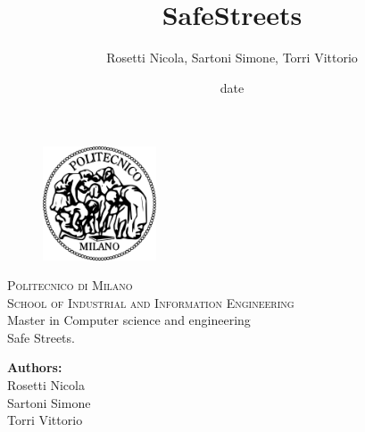 \documentclass[a4paper]{report}
\begin{document}
\title{SafeStreets}
\author{Rosetti Nicola, Sartoni Simone, Torri Vittorio}
\date{date} %

\begin{titlepage}
\begin{figure}[t]
\centering
\includegraphics[width=0.3\textwidth]{Logo}
\end{figure}
\begin{center}
    \textsc{ \LARGE{Politecnico di Milano \\}}
	\textsc{ \LARGE{School of Industrial and Information Engineering\\ }}
	\textnormal{ \LARGE{Master in Computer science and engineering\\}}
	\vspace{30mm}
	\fontsize{10mm}{7mm}\selectfont 
    \textup{Safe Streets.}\\
\end{center}

\vspace{23mm}

\begin{minipage}[t]{0.70\textwidth}
	\textnormal{\large{\bf Authors:\\}}
	{\large Rosetti Nicola \\ Sartoni Simone \\ Torri Vittorio }
	\fontsize{10mm}{5mm}\selectfont 
\end{minipage}
\vspace{20mm}


\end{titlepage}


\end{document}
